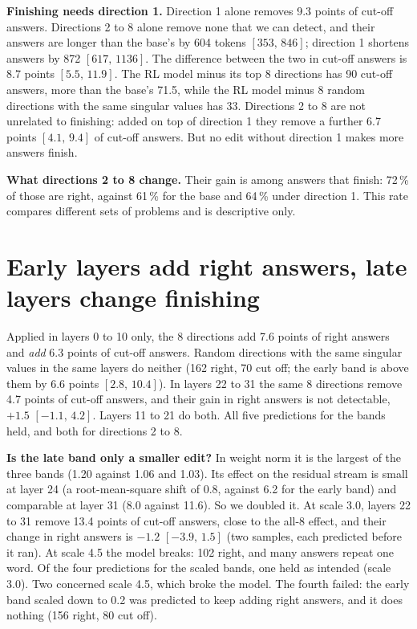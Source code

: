 \documentclass[10pt]{article}
\newcommand{\ci}[2]{$[#1,\,#2]$}
\begin{document}
\textbf{Finishing needs direction 1.} Direction 1 alone removes 9.3 points of cut-off answers. Directions 2 to
8 alone remove none that we can detect, and their answers are longer than the base's by 604 tokens
\ci{353}{846}; direction 1 shortens answers by 872 \ci{617}{1136}. The difference between the two in cut-off
answers is 8.7 points \ci{5.5}{11.9}. The RL model minus its top 8 directions has 90 cut-off answers, more
than the base's 71.5, while the RL model minus 8 random directions with the same singular values has 33.
Directions 2 to 8 are not unrelated to finishing: added on top of direction 1 they remove a further 6.7 points
\ci{4.1}{9.4} of cut-off answers. But no edit without direction 1 makes more answers finish.

\textbf{What directions 2 to 8 change.} Their gain is among answers that finish: 72\,\% of those are right,
against 61\,\% for the base and 64\,\% under direction 1. This rate compares different sets of problems and
is descriptive only.

\section{Early layers add right answers, late layers change finishing}
\label{sec:depth}

Applied in layers 0 to 10 only, the 8 directions add 7.6 points of right answers and \emph{add} 6.3 points of
cut-off answers. Random directions with the same singular values in the same layers do neither (162 right, 70
cut off; the early band is above them by 6.6 points \ci{2.8}{10.4}). In layers 22 to 31 the same 8 directions
remove 4.7 points of cut-off answers, and their gain in right answers is not detectable, $+1.5$
\ci{-1.1}{4.2}. Layers 11 to 21 do both. All five predictions for the bands held, and both for directions 2 to 8.

\textbf{Is the late band only a smaller edit?} In weight norm it is the largest of the three bands (1.20
against 1.06 and 1.03). Its effect on the residual stream is small at layer 24 (a root-mean-square shift of
0.8, against 6.2 for the early band) and comparable at layer 31 (8.0 against 11.6). So we doubled it.
At scale 3.0, layers 22 to 31 remove 13.4 points of cut-off answers, close to the all-8 effect, and their
change in right answers is $-1.2$ \ci{-3.9}{1.5} (two samples, each predicted before it ran). At scale 4.5 the model breaks: 102 right, and many answers repeat one word. Of the four predictions for
the scaled bands, one held as intended (scale 3.0). Two concerned scale 4.5, which broke the model. The
fourth failed: the early band scaled down to 0.2 was predicted to keep adding right answers, and it does nothing (156 right, 80
cut off).
\end{document}
